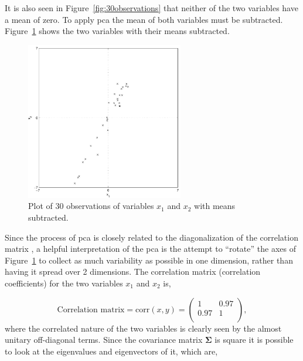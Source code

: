 It is also seen in Figure~\ref{fig:30observations} that neither of the two variables have a mean of zero. To apply \DIFdelbegin {}\DIFdelend \DIFaddbegin \gls{pca} \DIFaddend the mean of both variables must be subtracted. Figure~\ref{fig:30observationsBar} shows the two variables with their means subtracted.
\begin{figure}[!]
  \begin{center}
    \includegraphics[width=260px]{30observationsBar.pdf}
    \caption{Plot of 30 observations of variables $x_1$ and $x_2$ with means subtracted.}\label{fig:30observationsBar}
  \end{center}
\end{figure}

Since the process of \DIFdelbegin {}\DIFdelend \DIFaddbegin \gls{pca} \DIFaddend is closely related to the diagonalization of the correlation matrix \citep[p. 174]{Therrien1992}, a helpful interpretation of the \DIFdelbegin {}\DIFdelend \DIFaddbegin \gls{pca} \DIFaddend is the attempt to ``rotate'' the axes of Figure~\ref{fig:30observationsBar} to collect as much variability as possible in one dimension, rather than having it spread over 2 dimensions. The correlation matrix (correlation coefficients) for the two variables $x_1$ and $x_2$ is,

\begin{equation}\label{eq:corrcoef}
\textrm{Correlation matrix} = \textrm{corr}(x,y)= \left(
    \begin{array}{cc}
        1   & 0.97 \\
        0.97& 1    \\
    \end{array}\right),
\end{equation}
where the correlated nature of the two variables is clearly seen by the almost unitary off-diagonal terms. Since the covariance matrix $\boldsymbol\Sigma$ is square it is possible to look at the eigenvalues and eigenvectors of it, which are,

